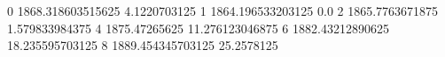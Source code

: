 0 1868.318603515625 4.1220703125
1 1864.196533203125 0.0
2 1865.7763671875 1.579833984375
4 1875.47265625 11.276123046875
6 1882.43212890625 18.235595703125
8 1889.454345703125 25.2578125
